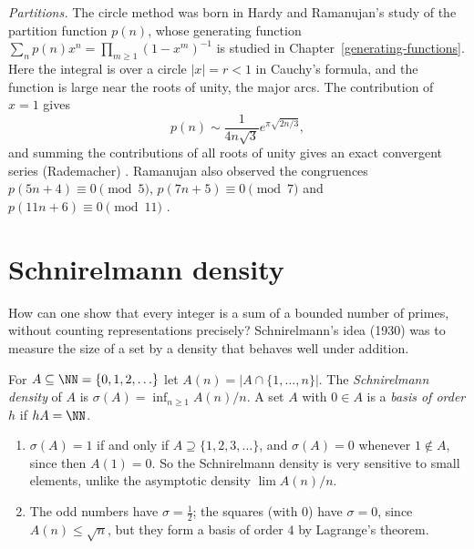 \begin{remark}\label{additive-number-theory:remark-partitions}
\emph{Partitions.} The circle method was born in Hardy and Ramanujan's study of the partition function $p(n)$, whose generating function $\sum_np(n)x^n = \prod_{m \geq 1}(1 - x^m)^{-1}$ is studied in
Chapter~\ref{generating-functions}. Here the integral is over a circle $|x| = r < 1$ in Cauchy's formula, and the function is large near the roots of unity, the major arcs. The contribution of
$x = 1$ gives
\[
p(n) \sim \frac{1}{4n\sqrt3}e^{\pi\sqrt{2n/3}},
\]
and summing the contributions of all roots of unity gives an exact convergent series (Rademacher) \cite{hardy-ramanujan-1917}. Ramanujan also observed the congruences $p(5n + 4) \equiv 0 \pmod 5$,
$p(7n + 5) \equiv 0 \pmod 7$ and $p(11n + 6) \equiv 0 \pmod{11}$ \cite{hardy-wright}.
\end{remark}

\section{Schnirelmann density}\label{additive-number-theory:section-schnirelmann}

How can one show that every integer is a sum of a bounded number of primes, without counting representations precisely? Schnirelmann's idea (1930) was to measure the size of a set by a density
that behaves well under addition.

\begin{definition}\label{additive-number-theory:definition-schnirelmann}
For $A \subseteq \NN = \{0, 1, 2, \ldots\}$ let $A(n) = |A \cap \{1, \ldots, n\}|$. The \emph{Schnirelmann density} of $A$ is $\sigma(A) = \inf_{n \geq 1}A(n)/n$. A set $A$ with $0 \in A$ is a \emph{basis of order $h$} if
$hA = \NN$.
\end{definition}

\begin{example}\label{additive-number-theory:example-schnirelmann}
\begin{enumerate}
\item $\sigma(A) = 1$ if and only if $A \supseteq \{1, 2, 3, \ldots\}$, and $\sigma(A) = 0$ whenever $1 \notin A$, since then $A(1) = 0$. So the Schnirelmann density is very sensitive to small elements,
unlike the asymptotic density $\lim A(n)/n$.
\item The odd numbers have $\sigma = \frac12$; the squares (with $0$) have $\sigma = 0$, since $A(n) \leq \sqrt n$, but they form a basis of order $4$ by Lagrange's theorem.
\end{enumerate}
\end{example}

